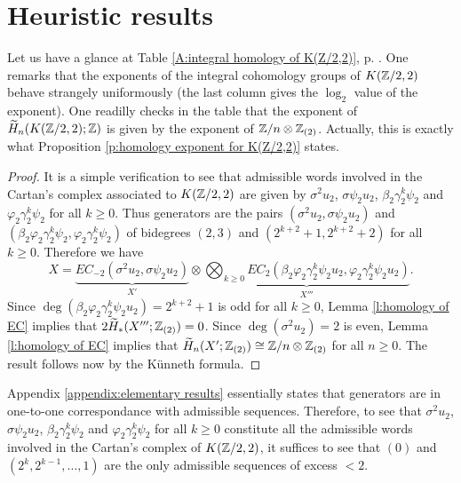 \section{Heuristic results}\label{section:heuristic}

Let us have a glance at Table \ref{A:integral homology of K(Z/2,2)}, p. \pageref{A:integral homology of K(Z/2,2)}. One remarks that the exponents of the integral cohomology groups of $K(\mathbb{Z}/2,2)$ behave strangely uniformously (the last column gives the $\log_2$ value of the exponent). One readilly checks in the table that the exponent of $\widetilde{H}_n(K(\mathbb{Z}/2,2);\mathbb{Z})$ is given by the exponent of $\mathbb{Z}/n\otimes\mathbb{Z}_{(2)}$. Actually, this is exactly what Proposition \ref{p:homology exponent for K(Z/2,2)} states.

\begin{prop_heuristic_H}

\end{prop_heuristic_H}

\begin{proof} %
It is a simple verification to see that admissible words involved in the Cartan's complex associated to $K(\mathbb{Z}/2,2)$ are given by $\sigma^2u_2$, $\sigma\psi_2u_2$, $\beta_2\gamma_2^k\psi_2$ and $\varphi_2\gamma_2^k\psi_2$ for all $k\geq0$. Thus generators are the pairs $(\sigma^2u_2,\sigma\psi_2u_2)$ and $(\beta_2\varphi_2\gamma_2^k\psi_2,\varphi_2\gamma_2^k\psi_2)$ of bidegrees $(2,3)$ and $(2^{k+2}+1,2^{k+2}+2)$ for all $k\geq0$. Therefore we have
$$
X=\underbrace{EC_{-2}(\sigma^2u_2,\sigma\psi_2u_2)}_{X'}\otimes\underbrace{\bigotimes_{k\geq0}EC_2(\beta_2\varphi_2\gamma_2^k\psi_2u_2,\varphi_2\gamma_2^k\psi_2u_2)}_{X'''}.
$$
Since $\deg(\beta_2\varphi_2\gamma_2^k\psi_2u_2)=2^{k+2}+1$ is odd for all $k\geq0$, Lemma \ref{l:homology of EC} implies that $2\widetilde{H}_*(X''';\mathbb{Z}_{(2)})=0$. Since $\deg(\sigma^2u_2)=2$ is even, Lemma \ref{l:homology of EC} implies that $\widetilde{H}_n(X';\mathbb{Z}_{(2)})\cong\mathbb{Z}/n\otimes\mathbb{Z}_{(2)}$ for all $n\geq0$. The result follows now by the K\"unneth formula.
\end{proof}

\begin{rem*}
Appendix \ref{appendix:elementary results} essentially states that generators are in one-to-one correspondance with admissible sequences. Therefore, to see that $\sigma^2u_2$, $\sigma\psi_2u_2$, $\beta_2\gamma_2^k\psi_2$ and $\varphi_2\gamma_2^k\psi_2$ for all $k\geq0$ constitute all the admissible words involved in the Cartan's complex of $K(\mathbb{Z}/2,2)$, it suffices to see that $(0)$ and $(2^k,2^{k-1},\dots,1)$ are the only admissible sequences of excess $<2$.
\end{rem*}

